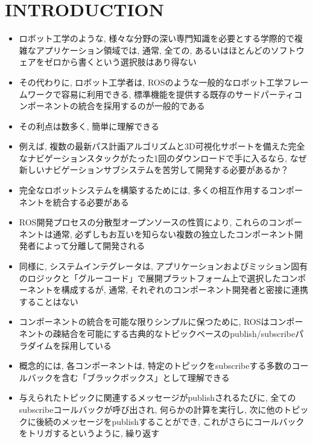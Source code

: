 
\section{INTRODUCTION}
\label{sec: introduction}

\begin{frame}{}
    \begin{itemize}
        \item ロボット工学のような, 様々な分野の深い専門知識を必要とする学際的で複雑なアプリケーション領域では, 通常, 全ての, あるいはほとんどのソフトウェアをゼロから書くという選択肢はあり得ない
        \item その代わりに, ロボット工学者は, ROSのような一般的なロボット工学フレームワークで容易に利用できる, 標準機能を提供する既存のサードパーティコンポーネントの統合を採用するのが一般的である
        \item その利点は数多く, 簡単に理解できる
        \item 例えば, 複数の最新パス計画アルゴリズムと3D可視化サポートを備えた完全なナビゲーションスタックがたった1回のダウンロードで手に入るなら, なぜ新しいナビゲーションサブシステムを苦労して開発する必要があるか？
    \end{itemize}
\end{frame}

\begin{frame}{}
    \begin{itemize}
        \item 完全なロボットシステムを構築するためには, 多くの相互作用するコンポーネントを統合する必要がある
        \item ROS開発プロセスの分散型オープンソースの性質により, これらのコンポーネントは通常, 必ずしもお互いを知らない複数の独立したコンポーネント開発者によって分離して開発される
        \item 同様に, システムインテグレータは, アプリケーションおよびミッション固有のロジックと「グルーコード」で展開プラットフォーム上で選択したコンポーネントを構成するが, 通常, それぞれのコンポーネント開発者と密接に連携することはない
    \end{itemize}
\end{frame}

\begin{frame}{}
    \begin{itemize}
        \item コンポーネントの統合を可能な限りシンプルに保つために, ROSはコンポーネントの疎結合を可能にする古典的なトピックベースのpublish/subscribeパラダイムを採用している
        \item 概念的には, 各コンポーネントは, 特定のトピックをsubscribeする多数のコールバックを含む「ブラックボックス」として理解できる
        \item 与えられたトピックに関連するメッセージがpublishされるたびに, 全てのsubscribeコールバックが呼び出され, 何らかの計算を実行し, 次に他のトピックに後続のメッセージをpublishすることができ, これがさらにコールバックをトリガするというように, 繰り返す
    \end{itemize}
\end{frame}

